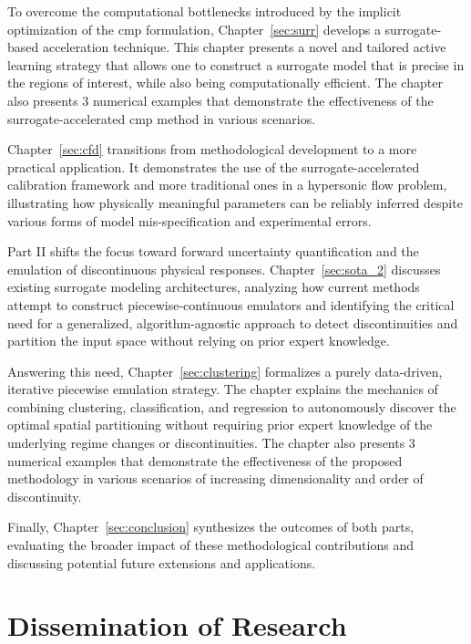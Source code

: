 \smallskip
To overcome the computational bottlenecks introduced by the implicit optimization of the \gls{cmp} formulation, Chapter~\ref{sec:surr} develops a surrogate-based acceleration technique. This chapter presents a novel and tailored active learning strategy that allows one to construct a surrogate model that is precise in the regions of interest, while also being computationally efficient. The chapter also presents 3 numerical examples that demonstrate the effectiveness of the surrogate-accelerated \gls{cmp} method in various scenarios.

\smallskip
Chapter~\ref{sec:cfd} transitions from methodological development to a more practical application. It demonstrates the use of the surrogate-accelerated calibration framework and more traditional ones in a hypersonic flow problem, illustrating how physically meaningful parameters can be reliably inferred despite various forms of model mis-specification and experimental errors. 

\smallskip
Part II shifts the focus toward forward uncertainty quantification and the emulation of discontinuous physical responses. Chapter~\ref{sec:sota_2} discusses existing surrogate modeling architectures, analyzing how current methods attempt to construct piecewise-continuous emulators and identifying the critical need for a generalized, algorithm-agnostic approach to detect discontinuities and partition the input space without relying on prior expert knowledge.

\smallskip
Answering this need, Chapter~\ref{sec:clustering} formalizes a purely data-driven, iterative piecewise emulation strategy. The chapter explains the mechanics of combining clustering, classification, and regression to autonomously discover the optimal spatial partitioning without requiring prior expert knowledge of the underlying regime changes or discontinuities. The chapter also presents 3 numerical examples that demonstrate the effectiveness of the proposed methodology in various scenarios of increasing dimensionality and order of discontinuity.

\smallskip
Finally, Chapter~\ref{sec:conclusion} synthesizes the outcomes of both parts, evaluating the broader impact of these methodological contributions and discussing potential future extensions and applications. 

\section{Dissemination of Research}

